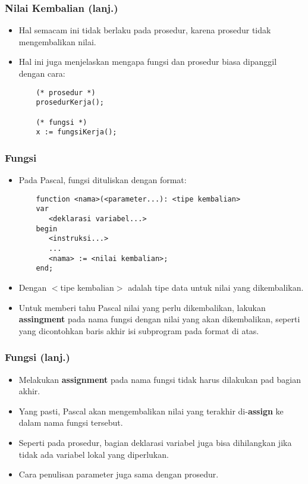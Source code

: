\documentclass{beamer}
\begin{document}
\begin{frame}[fragile]
\frametitle{Nilai Kembalian (lanj.)}
\begin{itemize}
	\item Hal semacam ini tidak berlaku pada prosedur, karena prosedur tidak mengembalikan nilai.
	\item Hal ini juga menjelaskan mengapa fungsi dan prosedur biasa dipanggil dengan cara:
	\begin{lstlisting}
	(* prosedur *)
	prosedurKerja();
	
	(* fungsi *)
	x := fungsiKerja();
	\end{lstlisting}
\end{itemize}
\end{frame}

\begin{frame}[fragile]
\frametitle{Fungsi}
\begin{itemize}
	\item Pada Pascal, fungsi dituliskan dengan format:
	\begin{lstlisting}
	function <nama>(<parameter...): <tipe kembalian>
	var
	   <deklarasi variabel...>
	begin
	   <instruksi...>
	   ...
	   <nama> := <nilai kembalian>;
	end;
	\end{lstlisting}
	\item Dengan $<$tipe kembalian$>$ adalah tipe data untuk nilai yang dikembalikan.
	\item Untuk memberi tahu Pascal nilai yang perlu dikembalikan, lakukan \textbf{assingment} pada nama fungsi dengan nilai yang akan dikembalikan, seperti yang dicontohkan baris akhir isi subprogram pada format di atas.
\end{itemize}
\end{frame}

\begin{frame}
\frametitle{Fungsi (lanj.)}
\begin{itemize}
	\item Melakukan \textbf{assignment} pada nama fungsi tidak harus dilakukan pad bagian akhir.
	\item Yang pasti, Pascal akan mengembalikan nilai yang terakhir di-\textbf{assign} ke dalam nama fungsi tersebut.
	\item Seperti pada prosedur, bagian deklarasi variabel juga bisa dihilangkan jika tidak ada variabel lokal yang diperlukan.
	\item Cara penulisan parameter juga sama dengan prosedur.
\end{itemize}
\end{frame}
\end{document}
